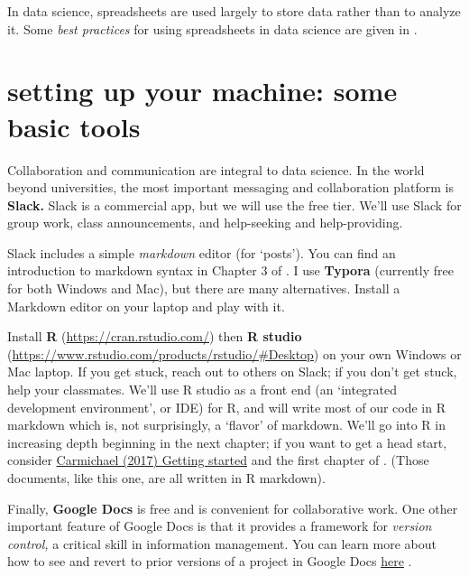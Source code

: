 \documentclass[openany]{book}
\begin{document}
In data science, spreadsheets are used largely to store data rather than to analyze it. Some \emph{best practices} for using spreadsheets in data science are given in \citet{broman2017data}.

\hypertarget{setting-up-your-machine-some-basic-tools}{%
\section{setting up your machine: some basic tools}\label{setting-up-your-machine-some-basic-tools}}

Collaboration and communication are integral to data science. In the world beyond universities, the most important messaging and collaboration platform is \textbf{Slack.} Slack is a commercial app, but we will use the free tier. We'll use Slack for group work, class announcements, and help-seeking and help-providing.

Slack includes a simple \emph{markdown} editor (for `posts'). You can find an introduction to markdown syntax in Chapter 3 of \citet{freeman2017informatics}. I use \textbf{Typora} (currently free for both Windows and Mac), but there are many alternatives. Install a Markdown editor on your laptop and play with it.

Install \textbf{R} (\url{https://cran.rstudio.com/}) then \textbf{R studio} (\url{https://www.rstudio.com/products/rstudio/\#Desktop}) on your own Windows or Mac laptop. If you get stuck, reach out to others on Slack; if you don't get stuck, help your classmates. We'll use R studio as a front end (an `integrated development environment', or IDE) for R, and will write most of our code in R markdown which is, not surprisingly, a `flavor' of markdown. We'll go into R in increasing depth beginning in the next chapter; if you want to get a head start, consider \href{https://idc9.github.io/stor390/notes/getting_started/getting_started.html}{Carmichael (2017) Getting started} and the first chapter of \citet{wickham2016r}. (Those documents, like this one, are all written in R markdown).

Finally, \textbf{Google Docs} is free and is convenient for collaborative work. One other important feature of Google Docs is that it provides a framework for \emph{version control,} a critical skill in information management. You can learn more about how to see and revert to prior versions of a project in Google Docs \href{https://sites.google.com/site/scriptsexamples/home/announcements/named-versions-new-version-history-google-docs}{here} .
\end{document}
